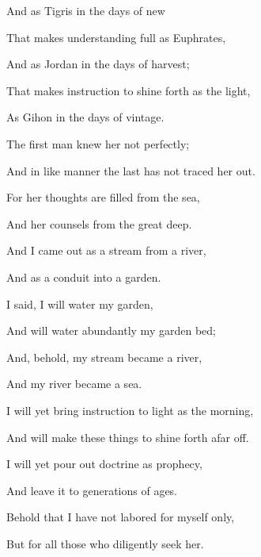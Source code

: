 {\par }{\Q And as Tigris in the days of new
{}
\par }{\Q {}That makes understanding full as Euphrates,
\par }{\Q And as Jordan in the days of harvest;
\par }{\Q {}That makes instruction to shine forth as the light,
\par }{\Q As Gihon in the days of vintage.
\par }{\Q {}The first man knew her not perfectly;
\par }{\Q And in like manner the last has not traced her out.
\par }{\Q {}For her thoughts are filled from the sea,
\par }{\Q And her counsels from the great deep.
\par }{\BB \par }{\Q {}And I came out as a
 stream from a river,
\par }{\Q And as a conduit into a garden.
\par }{\Q {}I said, I will water my garden,
\par }{\Q And will water abundantly my garden bed;
\par }{\Q And, behold, my stream became a river,
\par }{\Q And my river became a sea.
\par }{\Q {}I will yet bring instruction to light as the morning,
\par }{\Q And will make
 these things to shine forth afar off.
\par }{\Q {}I will yet pour out doctrine as prophecy,
\par }{\Q And leave it to generations of ages.
\par }{\Q {}Behold that I have not labored for myself only,
\par }{\Q But for all those who diligently seek her.
\par }{\BB \par }

